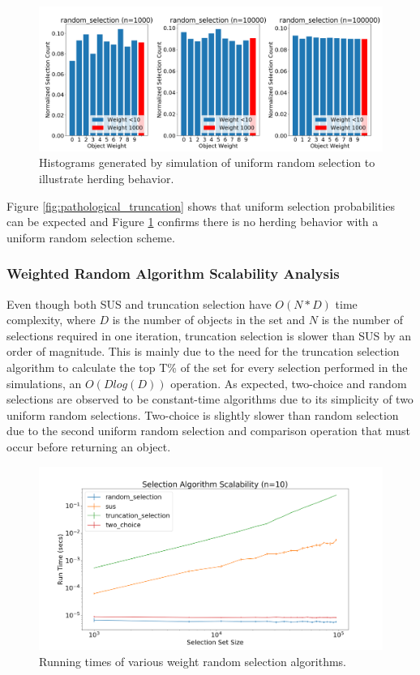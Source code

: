 \documentclass[12pt]{article}
\begin{document}
    \begin{figure}[htbp]
      \centering
      \includegraphics[scale=0.32]{images/pathological_random.png} 
      \caption{Histograms generated by simulation of uniform random selection
               to illustrate herding behavior.}
      \label{fig:pathological_random}
    \end{figure}

    Figure \ref{fig:pathological_truncation} shows that uniform selection
    probabilities can be expected and Figure \ref{fig:pathological_random}
    confirms there is no herding behavior with a uniform random selection
    scheme.

    \subsubsection{Weighted Random Algorithm Scalability Analysis}
    Even though both SUS and truncation selection have $O(N * D)$ time
    complexity, where $D$ is the number of objects in the set and $N$ is the number of
    selections required in one iteration, truncation selection is slower than
    SUS by an order of magnitude. This is mainly due to the need for the
    truncation selection algorithm to calculate the top T\% of the set for
    every selection performed in the simulations, an $O(Dlog(D))$ operation. As
    expected, two-choice and random selections are observed to be constant-time
    algorithms due to its simplicity of two uniform random selections.
    Two-choice is slightly slower than random selection due to the second
    uniform random selection and comparison operation that must occur before
    returning an object.

    \begin{figure}[htbp]
      \centering
      \includegraphics[scale=0.28]{images/random_scalability.png} 
      \caption{Running times of various weight random selection algorithms.}
      \label{fig:random_scalability}
    \end{figure}
\end{document}
